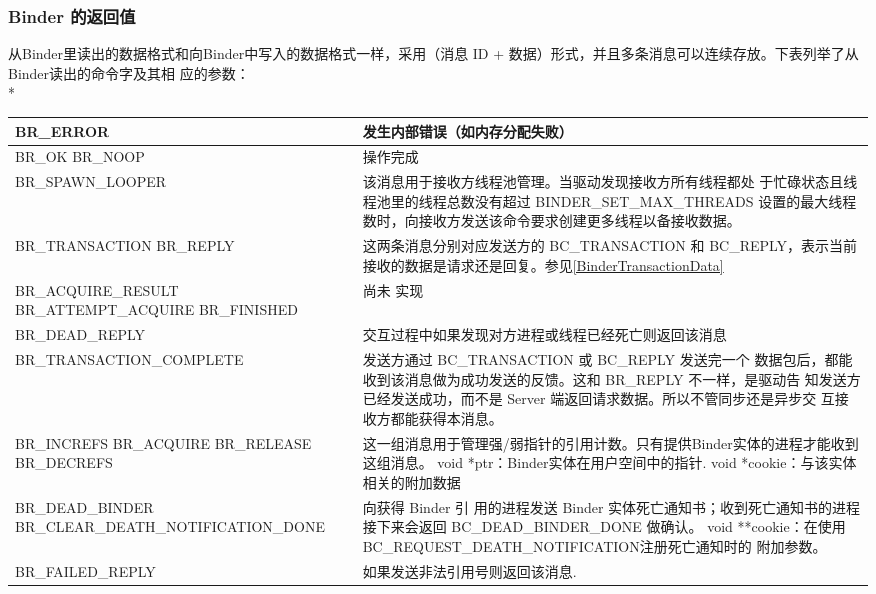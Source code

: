\documentclass[a4paper,11pt]{article}
\begin{document}
\subsubsection{Binder 的返回值}
从Binder里读出的数据格式和向Binder中写入的数据格式一样，采用（消息
ID + 数据）形式，并且多条消息可以连续存放。下表列举了从Binder读出的命令字及其相
应的参数：\\*
 \label{proto:binderreturn}
\begin{table}[ht]
\footnotesize
\begin{tabular}{|p{}|p{}|}\hline
    BR_ERROR & 发生内部错误（如内存分配失败） \\\hline
    BR_OK \newline BR_NOOP & 操作完成 \\\hline
    BR_SPAWN_LOOPER & 该消息用于接收方线程池管理。当驱动发现接收方所有线程都处
    于忙碌状态且线程池里的线程总数没有超过 BINDER_SET_MAX_THREADS
    设置的最大线程数时，向接收方发送该命令要求创建更多线程以备接收数据。
    \\\hline
    BR_TRANSACTION \newline BR_REPLY & 这两条消息分别对应发送方的
    BC_TRANSACTION 和 BC_REPLY，表示当前接收的数据是请求还是回复。参见\ref{BinderTransactionData}\\\hline
    BR_ACQUIRE_RESULT \newline BR_ATTEMPT_ACQUIRE \newline BR_FINISHED & 尚未
    实现 \\\hline
    BR_DEAD_REPLY & 交互过程中如果发现对方进程或线程已经死亡则返回该消息
    \\\hline
    BR_TRANSACTION_COMPLETE & 发送方通过 BC_TRANSACTION 或 BC_REPLY 发送完一个
    数据包后，都能收到该消息做为成功发送的反馈。这和 BR_REPLY 不一样，是驱动告
    知发送方已经发送成功，而不是 Server 端返回请求数据。所以不管同步还是异步交
    互接收方都能获得本消息。\\\hline
    BR_INCREFS \newline  BR_ACQUIRE \newline BR_RELEASE \newline BR_DECREFS \newline
    & 这一组消息用于管理强/弱指针的引用计数。只有提供Binder实体的进程才能收到这组消息。
   void *ptr：Binder实体在用户空间中的指针.  void *cookie：与该实体相关的附加数据 \\\hline
   BR_DEAD_BINDER \newline BR_CLEAR_DEATH_NOTIFICATION_DONE & 向获得 Binder 引
   用的进程发送 Binder 实体死亡通知书；收到死亡通知书的进程接下来会返回
   BC_DEAD_BINDER_DONE 做确认。
   \newline void **cookie：在使用BC_REQUEST_DEATH_NOTIFICATION注册死亡通知时的
   附加参数。\\\hline
   BR_FAILED_REPLY & 如果发送非法引用号则返回该消息. \\\hline
\end{tabular}
\end{table}
\end{document}
